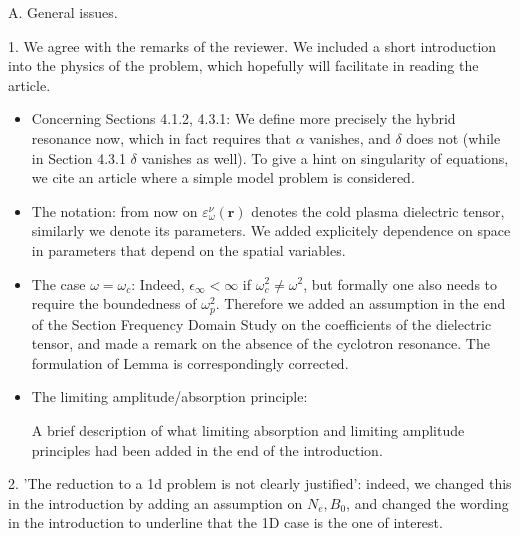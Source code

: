 \documentclass[a4paper,10pt]{article}
\begin{document}
A. General issues.

1. We agree with the remarks of the reviewer. We included a short introduction into the physics of the problem, 
which hopefully will facilitate in reading the article. 
\begin{itemize}
 \item Concerning Sections 4.1.2, 4.3.1: 
We define more precisely the hybrid resonance now, which in fact requires that $\alpha$ vanishes, 
and $\delta$ does not (while in Section 4.3.1 $\delta$ vanishes as well).
To give a hint on singularity of equations, we cite an article where a simple model problem is considered. 

\item 
The notation: 
from now on $\varepsilon^{\nu}_{\omega}(\mathbf{r})$ denotes the cold plasma dielectric tensor, similarly we denote its parameters. 
We added explicitely dependence on space in parameters that depend on the spatial variables. 

\item The case $\omega=\omega_c$:
Indeed, $\epsilon_{\infty}<\infty$ if $\omega_c^2\neq \omega^2$, but formally one also needs to require the boundedness of $\omega_p^2$. Therefore we 
added an assumption in the end of the Section Frequency Domain Study on the coefficients of the dielectric tensor, and made a remark on the absence
of the cyclotron resonance. The formulation of Lemma is correspondingly corrected. 

\item The limiting amplitude/absorption principle: 

A brief description of what limiting absorption and limiting amplitude principles had been added in the end of the introduction.
\end{itemize}


2. 'The reduction to a 1d problem is not clearly justified':  indeed, we changed this in the introduction by adding an assumption on $N_e, B_0$, 
and changed the wording in the introduction to underline that the 1D case is the one of interest. 
\end{document}

